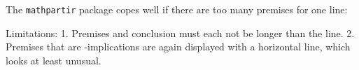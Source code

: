 \begin{isabellebody}
\begin{isamarkuptext}
The \texttt{mathpartir} package copes well if there are too many
premises for one line:
\begin{center}
\end{center}

Limitations: 1. Premises and conclusion must each not be longer than
the line.  2. Premises that are \isa{{\isasymLongrightarrow}}-implications are again
displayed with a horizontal line, which looks at least unusual.



\end{isamarkuptext}
\end{isabellebody}

